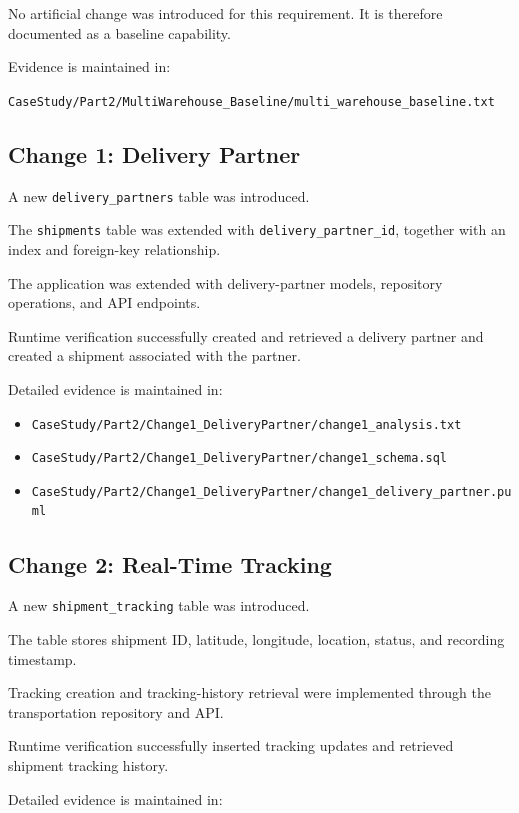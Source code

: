 \documentclass[12pt,a4paper]{article}
\begin{document}
No artificial change was introduced for this requirement. It is therefore documented as a baseline capability.

Evidence is maintained in:

\texttt{CaseStudy/Part2/MultiWarehouse\_Baseline/multi\_warehouse\_baseline.txt}

\subsection{Change 1: Delivery Partner}

A new \texttt{delivery\_partners} table was introduced.

The \texttt{shipments} table was extended with \texttt{delivery\_partner\_id}, together with an index and foreign-key relationship.

The application was extended with delivery-partner models, repository operations, and API endpoints.

Runtime verification successfully created and retrieved a delivery partner and created a shipment associated with the partner.

Detailed evidence is maintained in:

\begin{itemize}
    \item \texttt{CaseStudy/Part2/Change1\_DeliveryPartner/change1\_analysis.txt}
    \item \texttt{CaseStudy/Part2/Change1\_DeliveryPartner/change1\_schema.sql}
    \item \texttt{CaseStudy/Part2/Change1\_DeliveryPartner/change1\_delivery\_partner.puml}
\end{itemize}

\subsection{Change 2: Real-Time Tracking}

A new \texttt{shipment\_tracking} table was introduced.

The table stores shipment ID, latitude, longitude, location, status, and recording timestamp.

Tracking creation and tracking-history retrieval were implemented through the transportation repository and API.

Runtime verification successfully inserted tracking updates and retrieved shipment tracking history.

Detailed evidence is maintained in:
\end{document}
